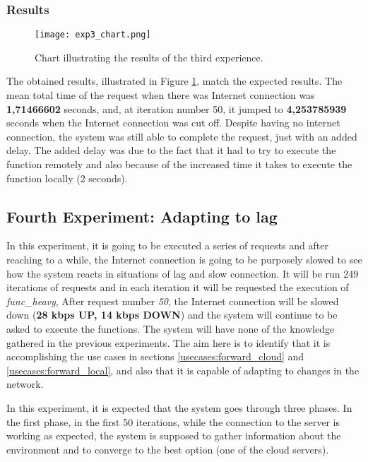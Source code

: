 \subsubsection{Results}

\begin{figure}[h]
  \begin{center}
    \texttt{[image: exp3\_chart.png]}
    \caption{Chart illustrating the results of the third experience.}
    \label{fig:exp3_chart}
  \end{center}
\end{figure}

The obtained results, illustrated in Figure \ref{fig:exp3_chart}, match the
expected results. The mean total time of the request when there was Internet
connection was \textbf{1,71466602} seconds, and, at iteration number 50, it
jumped to \textbf{4,253785939} seconds when the Internet connection was cut off.
Despite having no internet connection, the system was still able to complete the
request, just with an added delay. The added delay was due to the fact that it had
to try to execute the function remotely and also because of the increased time it
takes to execute the function locally (2 seconds). 

\subsection{Fourth Experiment: Adapting to lag}
\label{res:exp4}
In this experiment, it is going to be executed a series of requests and after
reaching to a while, the Internet connection is going to be purposely slowed to
see how the system reacts in situations of lag and slow connection. It will be run
249 iterations of requests and in each iteration it will be requested the
execution of \textit{func\_heavy}, After request number \textit{50}, the Internet
connection will be slowed down (\textbf{28 kbps UP, 14 kbps DOWN}) and the system
will continue to be asked to execute the functions. The system will have none of
the knowledge gathered in the previous experiments. The aim here is to identify
that it is accomplishing the use cases in sections \ref{usecases:forward_cloud} and
\ref{usecases:forward_local}, and also that it is capable of adapting to changes
in the network.

In this experiment, it is expected that the system goes through three phases. In
the first phase, in the first 50 iterations, while the connection to the server is
working as expected, the system is supposed to gather information about the
environment and to converge to the best option (one of the cloud servers).

